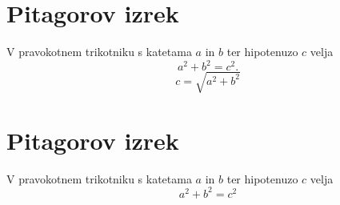 \documentclass{article}
\begin{document}
\section*{Pitagorov izrek}
V pravokotnem trikotniku s katetama \(a\) in \(b\) ter hipotenuzo \(c\) velja
\[ a^2 + b^2 = c^2. \]
\[c=\sqrt{a^2+b^2}\]




\section*{Pitagorov izrek}
V pravokotnem trikotniku s katetama \(a\) in \(b\) ter hipotenuzo \(c\) velja
\[ a^2 + b^2 = c^2 \]
\end{document}
